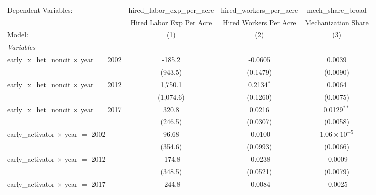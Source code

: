 
\begingroup
\centering
\begin{tabular}{lccc}
   \tabularnewline \midrule \midrule
   Dependent Variables:                             & hired\_labor\_exp\_per\_acre     & hired\_workers\_per\_acre    & mech\_share\_broad\\    
                                                    & Hired Labor Exp Per Acre         & Hired Workers Per Acre       & Mechanization Share \\   
   Model:                                           & (1)                              & (2)                          & (3)\\  
   \midrule
   \emph{Variables}\\
   early\_x\_het\_noncit $\times$ year $=$ 2002     & -185.2                           & -0.0605                      & 0.0039\\   
                                                    & (943.5)                          & (0.1479)                     & (0.0090)\\   
   early\_x\_het\_noncit $\times$ year $=$ 2012     & 1,750.1                          & 0.2134$^{*}$                 & 0.0064\\   
                                                    & (1,074.6)                        & (0.1260)                     & (0.0075)\\   
   early\_x\_het\_noncit $\times$ year $=$ 2017     & 320.8                            & 0.0216                       & 0.0129$^{**}$\\   
                                                    & (246.5)                          & (0.0307)                     & (0.0058)\\   
   early\_activator $\times$ year $=$ 2002          & 96.68                            & -0.0100                      & $1.06\times 10^{-5}$\\    
                                                    & (354.6)                          & (0.0993)                     & (0.0066)\\   
   early\_activator $\times$ year $=$ 2012          & -174.8                           & -0.0238                      & -0.0009\\   
                                                    & (348.5)                          & (0.0521)                     & (0.0079)\\   
   early\_activator $\times$ year $=$ 2017          & -244.8                           & -0.0084                      & -0.0025\\   

\end{tabular}
